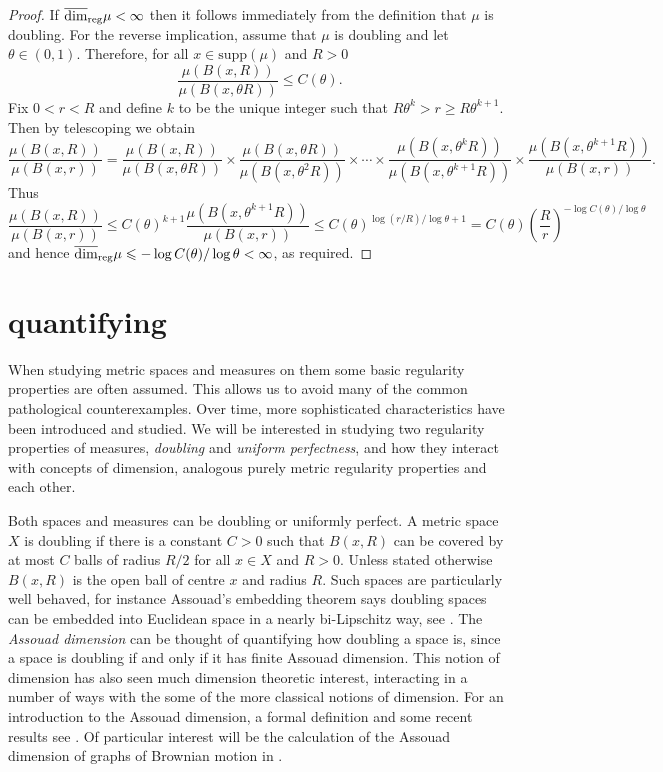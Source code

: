 \begin{proof}
	If $\overline{\dim}_{\textup{reg}} \mu <\infty$ then it follows immediately from the definition that $\mu$ is doubling.  For the reverse implication, assume that $\mu$ is doubling and let $\theta \in (0,1)$.  Therefore, for all $x \in \text{supp}(\mu)$ and $R>0$
	\[
	\frac{\mu(B(x,R))}{\mu(B(x,\theta R))} \le C(\theta).
	\]
	Fix  $0< r < R$ and  define $k$ to be the unique integer such that $R\theta^k > r \ge R\theta^{k+1}$. Then by telescoping we obtain
	\[
	\frac{\mu(B(x,R))}{\mu(B(x,r))} = \frac{\mu(B(x,R))}{\mu(B(x,\theta R))} \times \frac{\mu(B(x,\theta R))}{\mu(B(x,\theta^2 R))} \times\cdots \times \frac{\mu(B(x,\theta^k R))}{\mu(B(x,\theta^{k+1}R))} \times \frac{\mu(B(x,\theta^{k+1}R))}{\mu(B(x,r))}.
	\]
	Thus 
	\[
	\frac{\mu(B(x,R))}{\mu(B(x,r))} \le C(\theta)^{k+1}  \frac{\mu(B(x,\theta^{k+1}R))}{\mu(B(x,r))} \le C(\theta)^{\log(r/R) / \log \theta+1} = C(\theta) \left(\frac{R}{r} \right)^{-\log C(\theta) / \log \theta}
	\]
	and hence $\overline{\dim}_{\textup{reg}} \mu \leqslant -\log C(\theta) / \log \theta < \infty$, as required.
\end{proof}





\section{quantifying}
\label{sec:reg}




When studying metric spaces and measures on them some basic regularity properties are often assumed. This allows us to avoid many of the common pathological counterexamples. Over time, more sophisticated characteristics have been introduced and studied. We will be interested in studying two regularity properties of measures, \textit{doubling} and \textit{uniform perfectness}, and how they interact with concepts of dimension, analogous purely metric regularity properties and each other.

Both spaces and measures can be doubling or uniformly perfect. A metric space $X$ is doubling if there is a constant $C > 0$ such that $B(x,R)$ can be covered by at most $C$ balls of radius $R/2$ for all $x\in X$ and $R > 0$. Unless stated otherwise $B(x,R)$ is the open ball of centre $x$ and radius $R$. Such spaces are particularly well behaved, for instance Assouad's embedding theorem says doubling spaces can be embedded into Euclidean space in a nearly bi-Lipschitz way, see \cite{assouad}. The \textit{Assouad dimension} can be thought of quantifying how doubling a space is, since a space is doubling if and only if it has finite Assouad dimension. This notion of dimension has also seen much dimension theoretic interest, interacting in a number of ways with the some of the more classical notions of dimension. For an introduction to the Assouad dimension, a formal definition and some recent results see \cite{fraser, microsets, orponen, robinson}. Of particular interest will be the calculation of the Assouad dimension of graphs of Brownian motion in \cite{howroyd-yu}.

